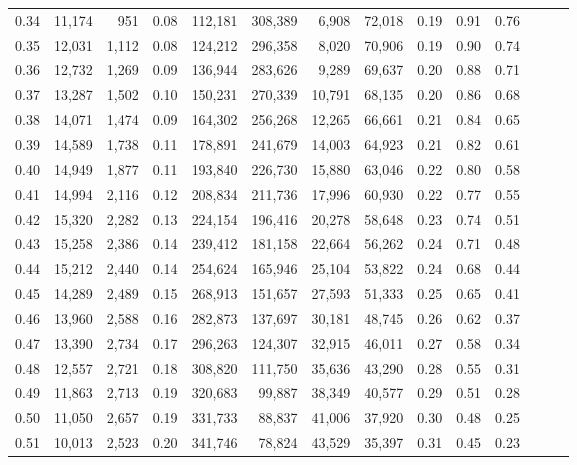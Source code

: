 \begin{tabular}{rrrrrrrrrrrrrr}
0.34 &  11,174 &    951 &  0.08 &  112,181 &  308,389 &   6,908 &  72,018 &  0.19 &  0.91 &      0.76 \\
0.35 &  12,031 &  1,112 &  0.08 &  124,212 &  296,358 &   8,020 &  70,906 &  0.19 &  0.90 &      0.74 \\
0.36 &  12,732 &  1,269 &  0.09 &  136,944 &  283,626 &   9,289 &  69,637 &  0.20 &  0.88 &      0.71 \\
0.37 &  13,287 &  1,502 &  0.10 &  150,231 &  270,339 &  10,791 &  68,135 &  0.20 &  0.86 &      0.68 \\
0.38 &  14,071 &  1,474 &  0.09 &  164,302 &  256,268 &  12,265 &  66,661 &  0.21 &  0.84 &      0.65 \\
0.39 &  14,589 &  1,738 &  0.11 &  178,891 &  241,679 &  14,003 &  64,923 &  0.21 &  0.82 &      0.61 \\
0.40 &  14,949 &  1,877 &  0.11 &  193,840 &  226,730 &  15,880 &  63,046 &  0.22 &  0.80 &      0.58 \\
0.41 &  14,994 &  2,116 &  0.12 &  208,834 &  211,736 &  17,996 &  60,930 &  0.22 &  0.77 &      0.55 \\
0.42 &  15,320 &  2,282 &  0.13 &  224,154 &  196,416 &  20,278 &  58,648 &  0.23 &  0.74 &      0.51 \\
0.43 &  15,258 &  2,386 &  0.14 &  239,412 &  181,158 &  22,664 &  56,262 &  0.24 &  0.71 &      0.48 \\
0.44 &  15,212 &  2,440 &  0.14 &  254,624 &  165,946 &  25,104 &  53,822 &  0.24 &  0.68 &      0.44 \\
0.45 &  14,289 &  2,489 &  0.15 &  268,913 &  151,657 &  27,593 &  51,333 &  0.25 &  0.65 &      0.41 \\
0.46 &  13,960 &  2,588 &  0.16 &  282,873 &  137,697 &  30,181 &  48,745 &  0.26 &  0.62 &      0.37 \\
0.47 &  13,390 &  2,734 &  0.17 &  296,263 &  124,307 &  32,915 &  46,011 &  0.27 &  0.58 &      0.34 \\
0.48 &  12,557 &  2,721 &  0.18 &  308,820 &  111,750 &  35,636 &  43,290 &  0.28 &  0.55 &      0.31 \\
0.49 &  11,863 &  2,713 &  0.19 &  320,683 &   99,887 &  38,349 &  40,577 &  0.29 &  0.51 &      0.28 \\
0.50 &  11,050 &  2,657 &  0.19 &  331,733 &   88,837 &  41,006 &  37,920 &  0.30 &  0.48 &      0.25 \\
0.51 &  10,013 &  2,523 &  0.20 &  341,746 &   78,824 &  43,529 &  35,397 &  0.31 &  0.45 &      0.23 \\

\end{tabular}
